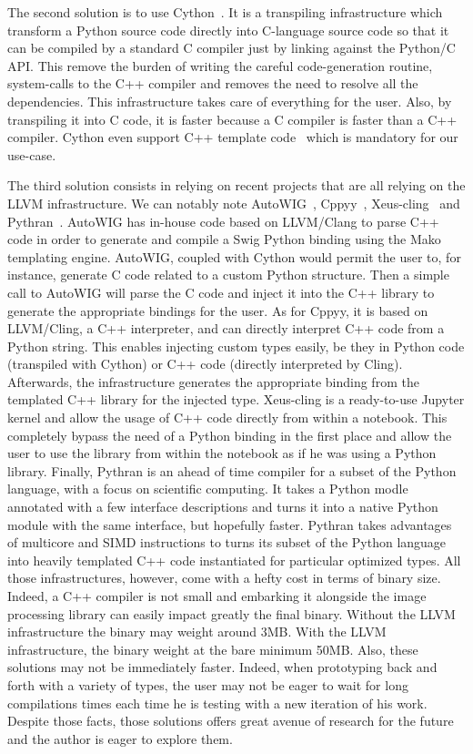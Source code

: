 The second solution is to use Cython~\parencite{behnel.2010.cython}. It is a transpiling infrastructure which transform
a Python source code directly into C-language source code so that it can be compiled by a standard C compiler just by
linking against the Python/C API. This remove the burden of writing the careful code-generation routine, system-calls
to the C++ compiler and removes the need to resolve all the dependencies. This infrastructure takes care of everything
for the user. Also, by transpiling it into C code, it is faster because a C compiler is faster than a C++ compiler.
Cython even support C++ template code~\parencite{behnel.2022.cython-template} which is mandatory for our use-case.

The third solution consists in relying on recent projects that are all relying on the LLVM infrastructure. We can
notably note AutoWIG~\parencite{fernique.2018.autowig}, Cppyy~\parencite{wimtlplavrijsen.2016.cppyy},
Xeus-cling~\parencite{quantstack.2021.xeus-cling} and Pythran~\parencite{guelton.2015.pythran}. AutoWIG has in-house
code based on LLVM/Clang to parse C++ code in order to generate and compile a Swig Python binding using the Mako
templating engine. AutoWIG, coupled with Cython would permit the user to, for instance, generate C code related to a
custom Python structure. Then a simple call to AutoWIG will parse the C code and inject it into the C++ library to
generate the appropriate bindings for the user. As for Cppyy, it is based on LLVM/Cling, a C++ interpreter, and can
directly interpret C++ code from a Python string. This enables injecting custom types easily, be they in Python code
(transpiled with Cython) or C++ code (directly interpreted by Cling). Afterwards, the infrastructure generates the
appropriate binding from the templated C++ library for the injected type. Xeus-cling is a ready-to-use Jupyter kernel
and allow the usage of C++ code directly from within a notebook. This completely bypass the need of a Python binding in
the first place and allow the user to use the library from within the notebook as if he was using a Python library.
Finally, Pythran is an ahead of time compiler for a subset of the Python language, with a focus on scientific computing.
It takes a Python modle annotated with a few interface descriptions and turns it into a native Python module with the
same interface, but hopefully faster. Pythran takes advantages of multicore and SIMD instructions to turns its subset of
the Python language into heavily templated C++ code instantiated for particular optimized types. All those
infrastructures, however, come with a hefty cost in terms of binary size. Indeed, a C++ compiler is not small and
embarking it alongside the image processing library can easily impact greatly the final binary. Without the LLVM
infrastructure the binary may weight around 3MB. With the LLVM infrastructure, the binary weight at the bare minimum
50MB. Also, these solutions may not be immediately faster. Indeed, when prototyping back and forth with a variety of
types, the user may not be eager to wait for long compilations times each time he is testing with a new iteration of his
work. Despite those facts, those solutions offers great avenue of research for the future and the author is eager to
explore them.


